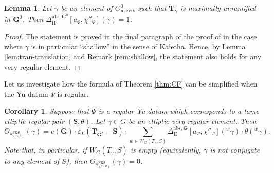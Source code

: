 \documentclass{amsart}
\newcommand{\abs}{\mathrm{abs}}
\newcommand{\evrs}{\mathrm{evrs}}
\newcommand{\FKS}{\mathrm{FKS}}
\newcommand{\bfT}{\mathbf{T}}
\newcommand{\x}{\mathbf{x}}
\newcommand{\bfG}{\mathbf{G}}
\newcommand{\bfS}{\mathbf{S}}
\newcommand{\II}{\mathrm{II}}
\theoremstyle{plain}
\newtheorem{lem}[thm]{Lemma}
\newtheorem{cor}[thm]{Corollary}
\theoremstyle{definition}
\theoremstyle{remark}
\theoremstyle{theorem}
\begin{document}
\begin{lem}\label{lem:max-ur}
Let $\gamma$ be an element of $G^{0}_{\bar{\x},\evrs}$ such that $\bfT_{\gamma}$ is maximally unramified in $\bfG^{0}$.
Then $\Delta_{\II}^{\abs,\bfG^{0}}[a_{\Psi},\chi''_{\Psi}](\gamma)=1$.
\end{lem}

\begin{proof}
The statement is proved in the final paragraph of the proof of \cite[Proposition 4.9.2]{Kal19} in the case where $\gamma$ is in particular ``shallow'' in the sense of Kaletha.
Hence, by Lemma \ref{lem:tran-translation} and Remark \ref{rem:shallow}, the statement also holds for any very regular element.
\end{proof}


Let us investigate how the formula of Theorem \ref{thm:CF} can be simplified when the Yu-datum $\Psi$ is regular.

\begin{cor}\label{cor:regsc}
Suppose that $\Psi$ is a regular Yu-datum which corresponds to a tame elliptic regular pair $(\bfS,\theta)$.
Let $\gamma \in G$ be an elliptic very regular element.
Then
\[
\Theta_{\pi^{\FKS}_{(\bfS,\theta)}}(\gamma)
=
e(\bfG)\cdot\varepsilon_{L}(\bfT_{\bfG^{\ast}}-\bfS)\cdot
\sum_{w\in W_{G}(T_{\gamma},S)}\Delta_{\II}^{\abs,\bfG}[a_{\Psi},\chi''_{\Psi}]({}^{w}\gamma)\cdot\theta({}^{w}\gamma).
\]
Note that, in particular, if $W_{G}(T_{\gamma},S)$ is empty (equivalently, $\gamma$ is not conjugate to any element of $S$), then $\Theta_{\pi^{\FKS}_{(\bfS,\theta)}}(\gamma)=0$.
\end{cor}
\end{document}
